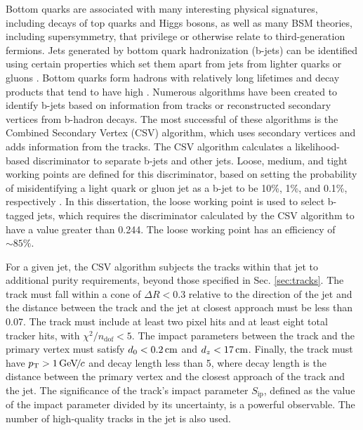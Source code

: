 \documentclass[12pt]{thesis}  %
\begin{document}
Bottom quarks are associated with many interesting physical signatures, including decays of top quarks and Higgs bosons, as well as many BSM theories, including supersymmetry, that privilege or otherwise relate to third-generation fermions. Jets generated by bottom quark hadronization (b-jets) can be identified using certain properties which set them apart from jets from lighter quarks or gluons \cite{BTV-12-001}. Bottom quarks form hadrons with relatively long lifetimes and decay products that tend to have high \pt. Numerous algorithms have been created to identify b-jets based on information from tracks or reconstructed secondary vertices from b-hadron decays. The most successful of these algorithms is the Combined Secondary Vertex (CSV) algorithm, which uses secondary vertices and adds information from the tracks. The CSV algorithm calculates a likelihood-based discriminator to separate b-jets and other jets. Loose, medium, and tight working points are defined for this discriminator, based on setting the probability of misidentifying a light quark or gluon jet as a b-jet to be 10\%, 1\%, and 0.1\%, respectively \cite{CMS-PAS-BTV-13-001}. In this dissertation, the loose working point is used to select b-tagged jets, which requires the discriminator calculated by the CSV algorithm to have a value greater than 0.244. The loose working point has an efficiency of ${\sim}85\%$.

For a given jet, the CSV algorithm subjects the tracks within that jet to additional purity requirements, beyond those specified in Sec. \ref{sec:tracks}. The track must fall within a cone of $\Delta R < 0.3$ relative to the direction of the jet and the distance between the track and the jet at closest approach must be less than 0.07\cm. The track must include at least two pixel hits and at least eight total tracker hits, with $\chi^2/n_{\text{dof}} < 5$. The impact parameters between the track and the primary vertex must satisfy $d_0 < 0.2\,\text{cm}$ and $d_z < 17\,\text{cm}$. Finally, the track must have $p_{\mathrm{T}}>1{\,\text{Ge\hspace{-.08em}V\hspace{-0.16em}/\hspace{-0.08em}}c}$ and decay length less than 5\cm, where decay length is the distance between the primary vertex and the closest approach of the track and the jet. The significance of the track's impact parameter $S_{\text{ip}}$, defined as the value of the impact parameter divided by its uncertainty, is a powerful observable. The number of high-quality tracks in the jet is also used.
\end{document}
